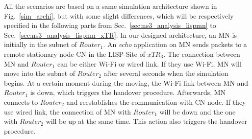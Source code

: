 
All the scenarios are based on a same simulation architecture shown in Fig.~\ref{sim_archi}, but with some slight differences, which will be respectively specified in the following parts from Sec.~\ref{sec:ns3_analysis_lispmn} to Sec.~\ref{sec:ns3_analysis_lispmn_xTR}. In our designed architecture, an MN is initially in the subnet of $Router_1$. An \emph{echo} application on MN sends packets to a remote stationary node CN in the LISP-Site of $xTR_3$. The connection between MN and $Router_1$ can be either Wi-Fi or wired link. If they use Wi-Fi, MN will move into the subnet of $Router_2$ after several seconds when the simulation begins. At a certain moment during the moving, the Wi-Fi link between MN and $Router_1$ is down, which triggers the handover procedure. Afterwards, MN connects to $Router_2$ and reestablishes the communication with CN node. If they use wired link, the connection of MN with $Router_1$ will be down and the one with $Router_2$ will be up at the same time. This action also triggers the handover procedure.

